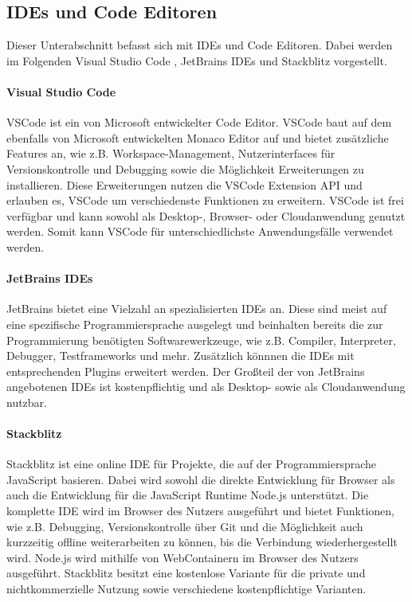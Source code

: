 \subsection{IDEs und Code Editoren}\label{section:stand-der-technik:weitere-entwicklungen:ides-und-code-editoren}

Dieser Unterabschnitt befasst sich mit IDEs und Code Editoren. Dabei werden im Folgenden Visual Studio Code \cite{noauthor_vscode_nodate}, JetBrains IDEs \cite{noauthor_jetbrains_nodate} und Stackblitz \cite{noauthor_stackblitz_nodate} vorgestellt.

\paragraph{Visual Studio Code}
\acf{VSCode} \cite{noauthor_vscode_nodate} ist ein von Microsoft \cite{noauthor_microsoft_nodate} entwickelter Code Editor. \ac{VSCode} baut auf dem ebenfalls von Microsoft entwickelten Monaco Editor \cite{noauthor_monaco_nodate} auf und bietet zusätzliche Features an, wie z.B. Workspace-Management, Nutzerinterfaces für Versionskontrolle und Debugging sowie die Möglichkeit Erweiterungen zu installieren. Diese Erweiterungen nutzen die VSCode Extension API \cite{noauthor_vscode-extension-api_nodate} und erlauben es, \ac{VSCode} um verschiedenste Funktionen zu erweitern. \ac{VSCode} ist frei verfügbar und kann sowohl als Desktop-, Browser- oder Cloudanwendung genutzt werden. Somit kann \ac{VSCode} für unterschiedlichste Anwendungsfälle verwendet werden.

\paragraph{JetBrains IDEs}
JetBrains \cite{noauthor_jetbrains_nodate} bietet eine Vielzahl an spezialisierten IDEs an. Diese sind meist auf eine spezifische Programmiersprache ausgelegt und beinhalten bereits die zur Programmierung benötigten Softwarewerkzeuge, wie z.B. Compiler, Interpreter, Debugger, Testframeworks und mehr. Zusätzlich könnnen die IDEs mit entsprechenden Plugins \cite{noauthor_jetbrains-plugins_nodate} erweitert werden. Der Großteil der von JetBrains angebotenen IDEs ist kostenpflichtig und als Desktop- sowie als Cloudanwendung nutzbar.

\paragraph{Stackblitz}
Stackblitz \cite{noauthor_stackblitz_nodate} ist eine online IDE für Projekte, die auf der Programmiersprache JavaScript basieren. Dabei wird sowohl die direkte Entwicklung für Browser als auch die Entwicklung für die JavaScript Runtime Node.js \cite{noauthor_nodejs_nodate} unterstützt. Die komplette IDE wird im Browser des Nutzers ausgeführt und bietet Funktionen, wie z.B. Debugging, Versionskontrolle über Git und die Möglichkeit auch kurzzeitig offline weiterarbeiten zu können, bis die Verbindung wiederhergestellt wird. Node.js wird mithilfe von WebContainern \cite{noauthor_webcontainer_nodate} im Browser des Nutzers ausgeführt. Stackblitz besitzt eine kostenlose Variante für die private und nichtkommerzielle Nutzung sowie verschiedene kostenpflichtige Varianten.